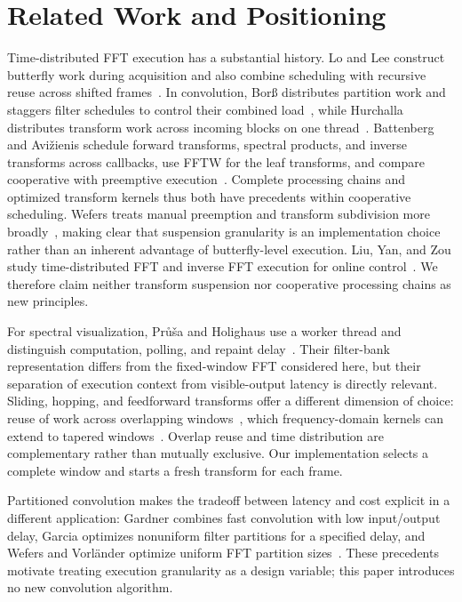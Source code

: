 \section{Related Work and Positioning}
\label{sec:related}
Time-distributed FFT execution has a substantial history. Lo and Lee construct
butterfly work during acquisition and also combine scheduling with recursive
reuse across shifted frames~\cite{lo1998,lo1999,lomoving1999}. In convolution,
Bor\ss{} distributes partition work and staggers filter schedules to control
their combined load~\cite{borss2009}, while Hurchalla distributes transform
work across incoming blocks on one thread~\cite{hurchalla2010}. Battenberg and
Avi\v{z}ienis schedule forward transforms, spectral products, and inverse
transforms across callbacks, use FFTW for the leaf transforms, and compare
cooperative with preemptive execution~\cite{battenberg2011}. Complete
processing chains and optimized transform kernels thus both have precedents
within cooperative scheduling. Wefers treats manual preemption and transform
subdivision more broadly~\cite{wefers2015}, making clear that suspension
granularity is an implementation choice rather than an inherent advantage of
butterfly-level execution. Liu, Yan, and Zou study time-distributed FFT and
inverse FFT execution for online control~\cite{liu2017}. We therefore claim
neither transform suspension nor cooperative processing chains as new
principles.

For spectral visualization, Pr\r{u}\v{s}a and Holighaus use a worker thread
and distinguish computation, polling, and repaint delay~\cite{prusa2016}.
Their filter-bank representation differs from the fixed-window FFT considered
here, but their separation of execution context from visible-output latency
is directly relevant. Sliding, hopping, and feedforward transforms offer a
different dimension of choice: reuse of work across overlapping
windows~\cite{lyons2021,park2014,garrido2016}, which frequency-domain kernels
can extend to tapered windows~\cite{rafii2018,eleftheriadis2023}. Overlap
reuse and time distribution are complementary rather than mutually exclusive.
Our implementation selects a complete window and starts a fresh transform for
each frame.

Partitioned convolution makes the tradeoff between latency and cost explicit
in a different application: Gardner combines fast convolution with low
input/output delay, Garcia optimizes nonuniform filter partitions for a
specified delay, and Wefers and Vorl\"ander optimize uniform FFT partition
sizes~\cite{gardner1995,garcia2002,wefers2011}. These precedents motivate
treating execution granularity as a design variable; this paper introduces no
new convolution algorithm.


